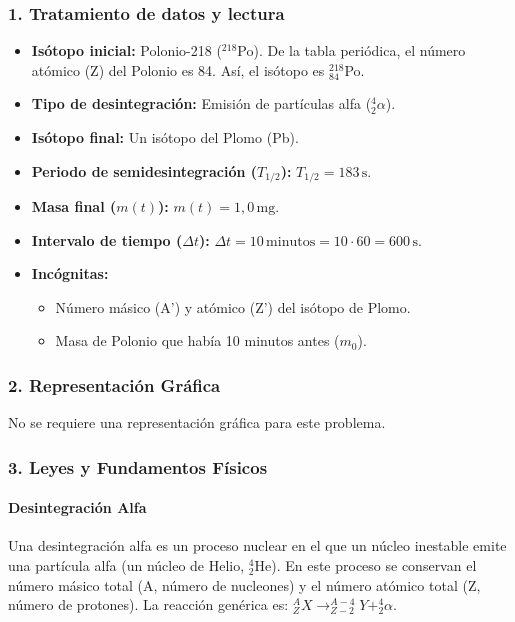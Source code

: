 \subsubsection*{1. Tratamiento de datos y lectura}
\begin{itemize}
    \item \textbf{Isótopo inicial:} Polonio-218 ($^{218}$Po). De la tabla periódica, el número atómico (Z) del Polonio es 84. Así, el isótopo es $^{218}_{84}$Po.
    \item \textbf{Tipo de desintegración:} Emisión de partículas alfa ($^4_2\alpha$).
    \item \textbf{Isótopo final:} Un isótopo del Plomo (Pb).
    \item \textbf{Periodo de semidesintegración ($T_{1/2}$):} $T_{1/2} = 183 \, \text{s}$.
    \item \textbf{Masa final ($m(t)$):} $m(t) = 1,0 \, \text{mg}$.
    \item \textbf{Intervalo de tiempo ($\Delta t$):} $\Delta t = 10 \, \text{minutos} = 10 \cdot 60 = 600 \, \text{s}$.
    \item \textbf{Incógnitas:}
    \begin{itemize}
        \item Número másico (A') y atómico (Z') del isótopo de Plomo.
        \item Masa de Polonio que había 10 minutos antes ($m_0$).
    \end{itemize}
\end{itemize}

\subsubsection*{2. Representación Gráfica}
No se requiere una representación gráfica para este problema.

\subsubsection*{3. Leyes y Fundamentos Físicos}
\paragraph*{Desintegración Alfa}
Una desintegración alfa es un proceso nuclear en el que un núcleo inestable emite una partícula alfa (un núcleo de Helio, $^4_2$He). En este proceso se conservan el número másico total (A, número de nucleones) y el número atómico total (Z, número de protones).
La reacción genérica es: $^{A}_{Z}X \rightarrow ^{A-4}_{Z-2}Y + ^4_2\alpha$.

